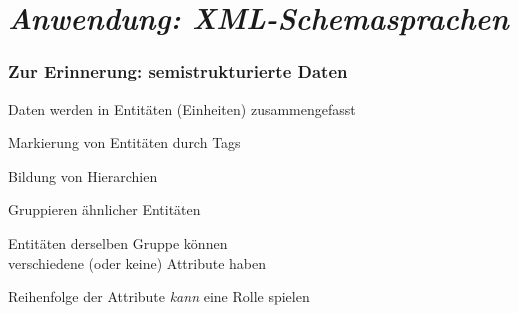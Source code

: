   \section[\protect\emph{XML}]{\protect\emph{Anwendung: XML-Schemasprachen}}

    \begin{frame}
      \frametitle{Zur Erinnerung: semistrukturierte Daten}
      
      Daten werden in Entitäten (Einheiten) zusammengefasst
      \begin{Itemize}
        \item
          Markierung von Entitäten durch Tags
        \item
          Bildung von Hierarchien
        \item
          Gruppieren ähnlicher Entitäten
        \item
          Entitäten derselben Gruppe können \\
          verschiedene (oder keine) Attribute haben
        \item
          Reihenfolge der Attribute \emph{kann} eine Rolle spielen
          \par
      \end{Itemize}
      
      \par\bigskip

    \end{frame}


